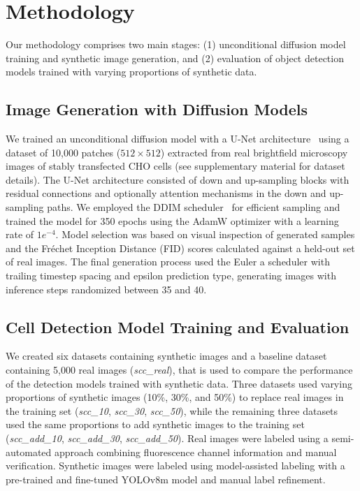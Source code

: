 \section{Methodology}
\label{sec:methodology}
Our methodology comprises two main stages: (1) unconditional diffusion model training and synthetic image generation, and (2) evaluation of object detection models trained with varying proportions of synthetic data.

\subsection{Image Generation with Diffusion Models}
\label{subsec:image-generation-with-diffusion-models}
We trained an unconditional diffusion model with a U-Net architecture~\cite{ronneberger_u-net_2015} using a dataset of  10,000 patches ($512 \times 512$) extracted from real brightfield microscopy images of stably transfected CHO cells (see supplementary material for dataset details).
The U-Net architecture consisted of down and up-sampling blocks with residual connections and optionally attention mechanisms in the down and up-sampling paths.
We employed the DDIM scheduler~\cite{song_denoising_2020} for efficient sampling and trained the model for 350 epochs using the AdamW optimizer with a learning rate of $1e^{-4}$.
Model selection was based on visual inspection of generated samples and the Fréchet Inception Distance (FID) scores calculated against a held-out set of real images.
The final generation process used the Euler a scheduler with trailing timestep spacing and epsilon prediction type, generating images with inference steps randomized between 35 and 40.

\subsection{Cell Detection Model Training and Evaluation}
\label{subsec:cell-detection-model-training-and-evaluation}
We created six datasets containing synthetic images and a baseline dataset containing 5,000 real images (\textit{scc\_real}), that is used to compare the performance of the detection models trained with synthetic data.
Three datasets used varying proportions of synthetic images (10\%, 30\%, and 50\%) to replace real images in the training set (\textit{scc\_10}, \textit{scc\_30}, \textit{scc\_50}), while the remaining three datasets used the same proportions to add synthetic images to the training set (\textit{scc\_add\_10}, \textit{scc\_add\_30}, \textit{scc\_add\_50}).
Real images were labeled using a semi-automated approach combining fluorescence channel information and manual verification.
Synthetic images were labeled using model-assisted labeling with a pre-trained and fine-tuned YOLOv8m model and manual label refinement.

